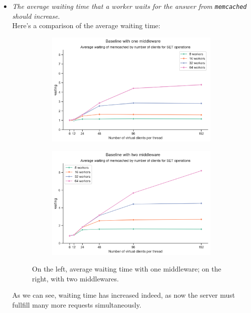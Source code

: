 \documentclass[11pt,a4paper]{article}
\renewcommand{\t}[1]{%
	{\texttt{#1}}}
\begin{document}
\begin{itemize}
	\item \emph{The average waiting time that a worker waits for the answer from \t{memcached} should increase}.\\
		Here's a comparison of the average waiting time:
		\begin{figure}[H]
			\begin{subfigure}[b]{0.5\linewidth}
				\includegraphics[width=\linewidth]{images/middleware_2/waiting_middleware_1.pdf}
			\end{subfigure}
			\begin{subfigure}[b]{0.5\linewidth}
				\includegraphics[width=\linewidth]{images/middleware_2/last_graph_set_waiting.pdf}
			\end{subfigure}
			\caption{On the left, average waiting time with one middleware; on the right, with two middlewares.}
			\label{fig:boat1}
		\end{figure}
		As we can see, waiting time has increased indeed, as now the server must fullfill many more requests simultaneously.

\end{itemize}
\end{document}
